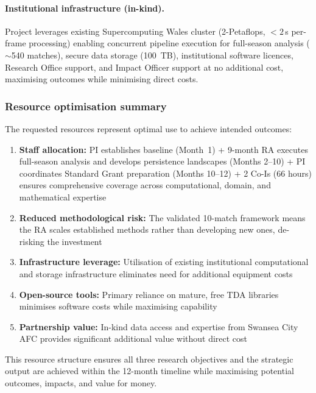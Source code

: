 \paragraph{Institutional infrastructure (in-kind).}
Project leverages existing Supercomputing Wales cluster (2-Petaflops, ${<}2$\,s per-frame processing) enabling concurrent pipeline execution for full-season analysis ($\sim$540 matches), secure data storage (100~TB), institutional software licences, Research Office support, and Impact Officer support at no additional cost, maximising outcomes while minimising direct costs.

\subsubsection{Resource optimisation summary}

The requested resources represent optimal use to achieve intended outcomes:
\begin{enumerate}[label=\arabic*., itemsep=0.25em]
  \item \textbf{Staff allocation:} PI establishes baseline (Month~1) + 9-month RA executes full-season analysis and develops persistence landscapes (Months 2--10) + PI coordinates Standard Grant preparation (Months 10--12) + 2 Co-Is (66 hours) ensures comprehensive coverage across computational, domain, and mathematical expertise
  \item \textbf{Reduced methodological risk:} The validated 10-match framework \citep{Brown2026} means the RA scales established methods rather than developing new ones, de-risking the investment
  \item \textbf{Infrastructure leverage:} Utilisation of existing institutional computational and storage infrastructure eliminates need for additional equipment costs
  \item \textbf{Open-source tools:} Primary reliance on mature, free TDA libraries minimises software costs while maximising capability
  \item \textbf{Partnership value:} In-kind data access and expertise from Swansea City AFC provides significant additional value without direct cost
\end{enumerate}

This resource structure ensures all three research objectives and the strategic output are achieved within the 12-month timeline while maximising potential outcomes, impacts, and value for money.
